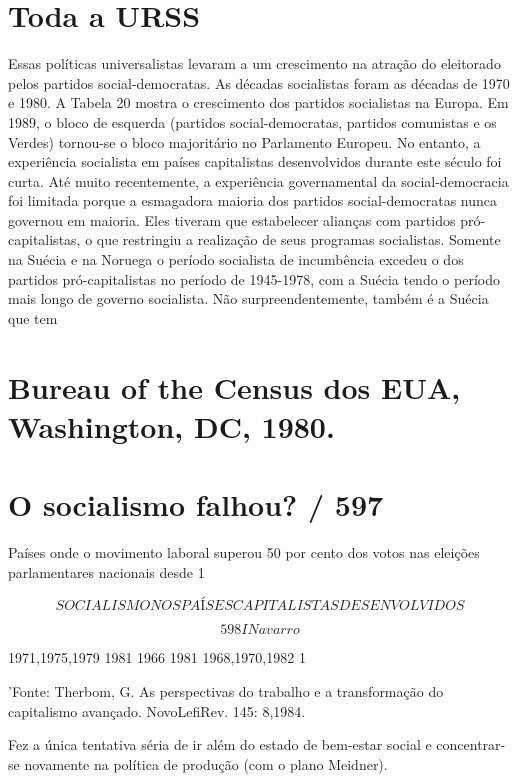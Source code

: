 {{{\section{Toda a URSS}
 \par 
Essas políticas universalistas levaram a um crescimento na atração do eleitorado pelos partidos social-democratas. As décadas socialistas foram as décadas de 1970 e 1980. A Tabela {\color{blue}20} mostra o crescimento dos partidos socialistas na Europa. Em 1989, o bloco de esquerda (partidos social-democratas, partidos comunistas e os Verdes) tornou-se o bloco majoritário no Parlamento Europeu. No entanto, a experiência socialista em países capitalistas desenvolvidos durante este século foi curta. Até muito recentemente, a experiência governamental da social-democracia foi limitada porque a esmagadora maioria dos partidos social-democratas nunca governou em maioria. Eles tiveram que estabelecer alianças com partidos pró-capitalistas, o que restringiu a realização de seus programas socialistas. Somente na Suécia e na Noruega o período socialista de incumbência excedeu o dos partidos pró-capitalistas no período de 1945-1978, com a Suécia tendo o período mais longo de governo socialista. Não surpreendentemente, também é a Suécia que tem
 \par 
\section{Bureau of the Census dos EUA, Washington, DC, 1980.}
 \par 
\section{O socialismo falhou? / 597}
 \par 
Países onde o movimento laboral superou {\color{blue}50} por cento dos votos nas eleições parlamentares nacionais desde 1%
 \par 
\[SOCIALISMO NOS PAÍSES CAPITALISTAS DESENVOLVIDOS\]
 \par 
\[598 I Navarro\]
 \par 
1971,1975,1979 1981 1966 1981 1968,1970,1982 1%
 \par 
'Fonte: Therbom, G. As perspectivas do trabalho e a transformação do capitalismo avançado. NovoLefiRev. 145: 8,1984.
 \par 
Fez a única tentativa séria de ir além do estado de bem-estar social e concentrar-se novamente na política de produção (com o plano Meidner).
 \par 
}}}
